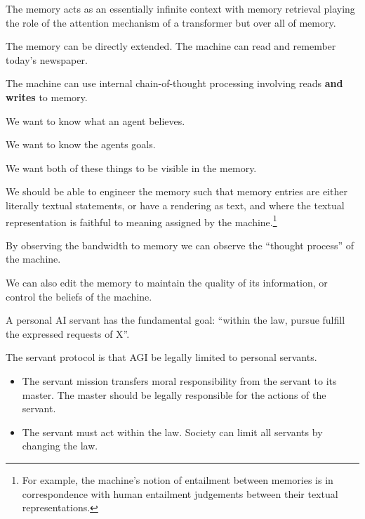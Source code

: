 {

The memory acts as an essentially infinite context with memory retrieval playing the role of the attention mechanism of a transformer
but over all of memory.

\vfill
The memory can be directly extended. The machine can read and remember today's newspaper.

\vfill
The machine can use internal chain-of-thought processing involving reads {\bf and writes} to memory.



We want to know what an agent believes.

\vfill
We want to know the agents goals.

\vfill
We want both of these things to be visible in the memory.


\vfill
We should be able to engineer the memory such that memory entries are either literally textual statements,
or have a rendering as text, and where the textual representation is faithful to meaning assigned by the machine.\footnote{\Large For example, the machine's notion of entailment
between memories is in correspondence with human entailment judgements between their textual representations.}

\vfill
By observing the bandwidth to memory we can observe the ``thought process'' of the machine.

\vfill
We can also edit the memory to maintain the quality of its information, or control the beliefs of the machine.


A personal AI servant has the fundamental goal: ``within the law, pursue fulfill the expressed requests of X''.

\vfill
The servant protocol is that AGI be legally limited to personal servants.


\begin{itemize}
\item The servant mission transfers moral responsibility from the servant to its master.
The master should be legally responsible for the actions of the servant.

\vfill
\item The servant must act within the law. Society can limit all servants by changing the law.


\end{itemize}}
